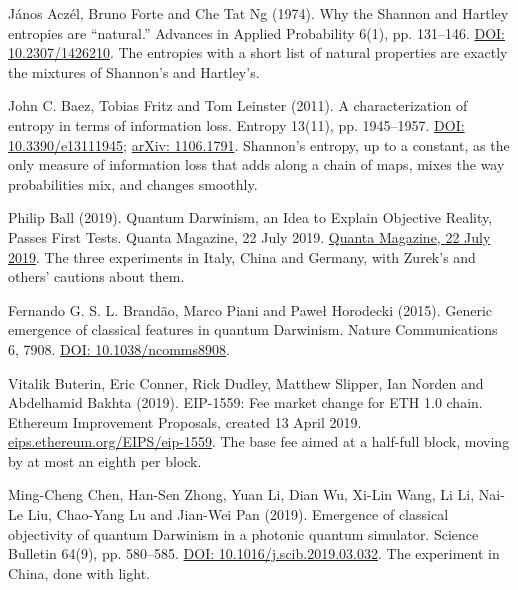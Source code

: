 \documentclass[11pt,twoside]{article}
\theoremstyle{thielethm}
\theoremstyle{thieledef}
\theoremstyle{thieledef}
\theoremstyle{thieledef}
\theoremstyle{thielethm}
\theoremstyle{thieleobs}
\theoremstyle{thielethm}
\begin{document}
\noindent J\'anos Acz\'el, Bruno Forte and Che Tat Ng (1974). Why the Shannon and Hartley entropies are ``natural.'' Advances in Applied Probability 6(1), pp. 131--146. \href{https://doi.org/10.2307/1426210}{DOI: 10.2307/1426210}. The entropies with a short list of natural properties are exactly the mixtures of Shannon's and Hartley's.
\par\medskip

\noindent John C. Baez, Tobias Fritz and Tom Leinster (2011). A characterization of entropy in terms of information loss. Entropy 13(11), pp. 1945--1957. \href{https://doi.org/10.3390/e13111945}{DOI: 10.3390/e13111945}; \href{https://arxiv.org/abs/1106.1791}{arXiv: 1106.1791}. Shannon's entropy, up to a constant, as the only measure of information loss that adds along a chain of maps, mixes the way probabilities mix, and changes smoothly.
\par\medskip

\noindent Philip Ball (2019). Quantum Darwinism, an Idea to Explain Objective Reality, Passes First Tests. Quanta Magazine, 22 July 2019. \href{https://www.quantamagazine.org/quantum-darwinism-an-idea-to-explain-objective-reality-passes-first-tests-20190722/}{Quanta Magazine, 22 July 2019}. The three experiments in Italy, China and Germany, with Zurek's and others' cautions about them.
\par\medskip

\noindent Fernando G. S. L. Brand\~ao, Marco Piani and Pawe\l{} Horodecki (2015). Generic emergence of classical features in quantum Darwinism. Nature Communications 6, 7908. \href{https://doi.org/10.1038/ncomms8908}{DOI: 10.1038/ncomms8908}.
\par\medskip

\noindent Vitalik Buterin, Eric Conner, Rick Dudley, Matthew Slipper, Ian Norden and Abdelhamid Bakhta (2019). EIP-1559: Fee market change for ETH 1.0 chain. Ethereum Improvement Proposals, created 13 April 2019. \href{https://eips.ethereum.org/EIPS/eip-1559}{eips.ethereum.org/EIPS/eip-1559}. The base fee aimed at a half-full block, moving by at most an eighth per block.
\par\medskip

\noindent Ming-Cheng Chen, Han-Sen Zhong, Yuan Li, Dian Wu, Xi-Lin Wang, Li Li, Nai-Le Liu, Chao-Yang Lu and Jian-Wei Pan (2019). Emergence of classical objectivity of quantum Darwinism in a photonic quantum simulator. Science Bulletin 64(9), pp. 580--585. \href{https://doi.org/10.1016/j.scib.2019.03.032}{DOI: 10.1016/j.scib.2019.03.032}. The experiment in China, done with light.
\par\medskip
\end{document}
